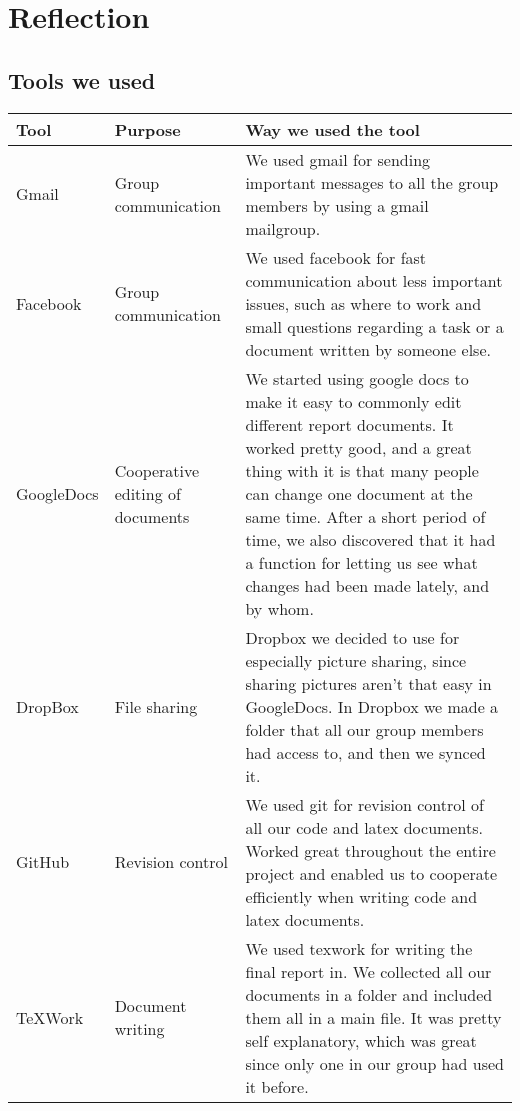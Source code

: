 

\chapter{Reflection}
\section{Tools we used}

\begin{tabularx}{\linewidth}{>{\setlength\hsize{.5\hsize}}X|>{\setlength\hsize{0.3\hsize}}X|>{\setlength\hsize{1\hsize}}X}
\textbf{Tool} & \textbf{Purpose} & \textbf{Way we used the tool} \\ \hline \hline

Gmail & Group communication &We used gmail for sending important messages to all the group members by using a gmail mailgroup.\\ \hline

Facebook & Group communication &We used facebook for fast communication about less important issues, such as where to work and small questions regarding a task or a document written by someone else.\\ \hline

GoogleDocs &Cooperative editing of documents &We started using google docs to make it easy to commonly edit different report documents. It worked pretty good, and a great thing with it is that many people can change one document at the same time. After a short period of time, we also discovered that it had a function for letting us see what changes had been made lately, and by whom.\\ \hline

DropBox & File sharing &Dropbox we decided to use for especially picture sharing, since sharing pictures aren’t that easy in GoogleDocs. In Dropbox we made a folder that all our group members had access to, and then we synced it.\\ \hline

GitHub &  Revision control&We used git for revision control of all our code and latex documents. Worked great throughout the entire project and enabled us to cooperate efficiently when writing code and latex documents.\\ \hline

TeXWork & Document writing &We used texwork for writing the final report in. We collected all our documents in a folder and included them all in a main file. It was pretty self explanatory, which was great since only one in our group had used it before.\\ \hline


\end{tabularx}

